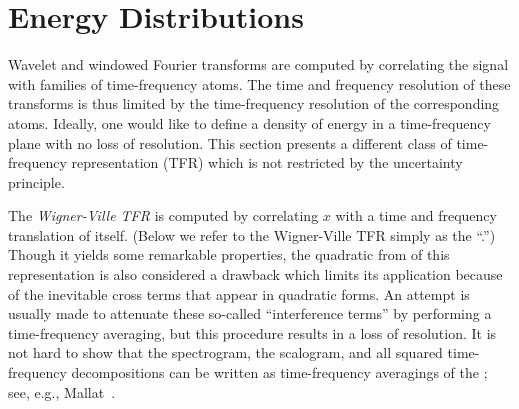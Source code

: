 \section{Energy Distributions}
\label{sec:energy}
Wavelet and windowed Fourier transforms are computed by
correlating the signal with families of time-frequency atoms.  The
time and frequency resolution of these transforms is thus limited by
the time-frequency resolution of the corresponding atoms.  Ideally,
one would like to define a density of energy in a time-frequency
plane with no loss of resolution.  This section presents a
different class of time-frequency representation (TFR) which is not
restricted by the uncertainty principle.  

The \emph{Wigner-Ville TFR} is computed by
correlating $x$ with a time and frequency translation of itself.
(Below we refer to the Wigner-Ville TFR simply as 
the ``\WT.'')  Though it yields some remarkable
properties, the quadratic from of this representation is also 
considered a drawback which limits its application because of the inevitable
cross terms that appear in quadratic forms.  An attempt is usually made to 
attenuate these so-called
``interference terms'' by performing a time-frequency averaging, but this 
procedure results in a loss of resolution. It is not hard to show
that the spectrogram, the scalogram, and all squared time-frequency
decompositions can be written as time-frequency averagings of the
\WT; see, e.g., Mallat~\citeyear{Mallat:1998}.


